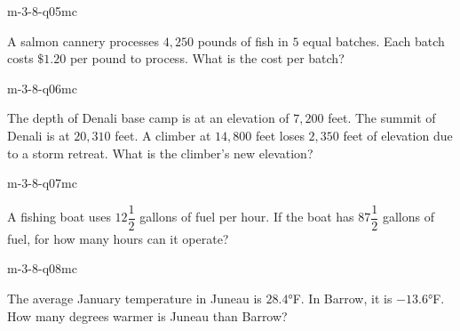 \begin{practiceQuestion}{m-3-8-q05}{mc}
\begin{questionText}
A salmon cannery processes $4{,}250$ pounds of fish in $5$ equal batches. Each batch costs $\$1.20$ per pound to process. What is the cost per batch?
\end{questionText}
\end{practiceQuestion}

\begin{practiceQuestion}{m-3-8-q06}{mc}
\begin{questionText}
The depth of Denali base camp is at an elevation of $7{,}200$ feet. The summit of Denali is at $20{,}310$ feet. A climber at $14{,}800$ feet loses $2{,}350$ feet of elevation due to a storm retreat. What is the climber's new elevation?
\end{questionText}
\end{practiceQuestion}

\begin{practiceQuestion}{m-3-8-q07}{mc}
\begin{questionText}
A fishing boat uses $12\dfrac{1}{2}$ gallons of fuel per hour. If the boat has $87\dfrac{1}{2}$ gallons of fuel, for how many hours can it operate?
\end{questionText}
\end{practiceQuestion}

\begin{practiceQuestion}{m-3-8-q08}{mc}
\begin{questionText}
The average January temperature in Juneau is $28.4°$F. In Barrow, it is $-13.6°$F. How many degrees warmer is Juneau than Barrow?
\end{questionText}
\end{practiceQuestion}

